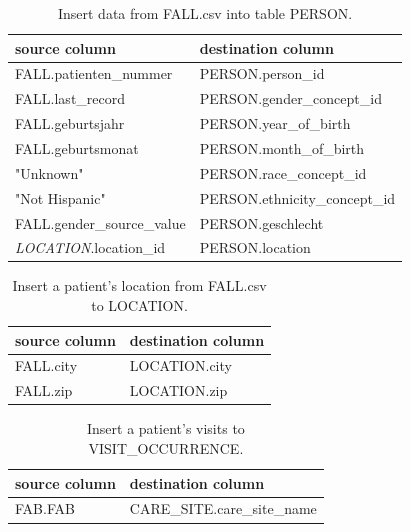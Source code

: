 \begin{table} [htbp]
\begin{tabular}{|l|l|}
 \hline
  \textbf{source column} & \textbf{destination column} \\
  \hline
  FALL.patienten\_nummer & PERSON.person\_id \\
  FALL.last\_record & PERSON.gender\_concept\_id \\
  FALL.geburtsjahr & PERSON.year\_of\_birth \\
  FALL.geburtsmonat & PERSON.month\_of\_birth \\
  "Unknown" & PERSON.race\_concept\_id \\
  "Not Hispanic" & PERSON.ethnicity\_concept\_id \\
  FALL.gender\_source\_value & PERSON.geschlecht \\
  \textit{LOCATION}.location\_id & PERSON.location \\
  \hline
\end{tabular}
\caption{Insert data from FALL.csv into table PERSON.}
\label{etl-person}
\end{table}

\begin{table} [htbp]
\begin{tabular}{|l|l|}
  \hline
  \textbf{source column} & \textbf{destination column} \\
  \hline
  FALL.city & LOCATION.city \\
  FALL.zip & LOCATION.zip \\
  \hline
\end{tabular}
\caption{Insert a patient's location from FALL.csv to LOCATION.}
\label{etl-location}
\end{table}

\begin{table} [htbp]
\begin{tabular}{|l|l|}
  \hline
  \textbf{source column} & \textbf{destination column} \\
  \hline
  FAB.FAB & CARE\_SITE.care\_site\_name \\
  \hline
\end{tabular}
\caption{Insert a patient's visits to VISIT\_OCCURRENCE.}
\label{etl-visit}
\end{table}

